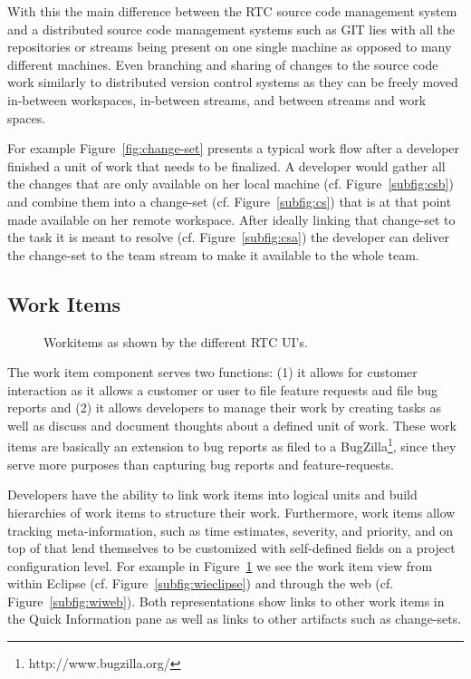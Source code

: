 With this the main difference between the RTC source code management system and a distributed source code management systems such as GIT lies with all the repositories or streams being present on one single machine as opposed to many different machines.
Even branching and sharing of changes to the source code work similarly to distributed version control systems as they can be freely moved in-between workspaces, in-between streams, and between streams and work spaces.

For example Figure~\ref{fig:change-set} presents a typical work flow after a developer finished a unit of work that needs to be finalized.
A developer would gather all the changes that are only available on her local machine (cf. Figure~\ref{subfig:csb}) and combine them into a change-set (cf. Figure~\ref{subfig:cs}) that is at that point made available on her remote workspace.
After ideally linking that change-set to the task it is meant to resolve (cf. Figure~\ref{subfig:csa}) the developer can deliver the change-set to the team stream to make it available to the whole team.

\subsection{Work Items}
\begin{figure}
\centering
{}

\caption{Workitems as shown by the different RTC UI's.}
\label{fig:wi}
\end{figure}
The work item component serves two functions: (1) it allows for customer interaction as it allows a customer or user to file feature requests and file bug reports and (2) it allows developers to manage their work by creating tasks as well as discuss and document thoughts about a defined unit of work.
These work items are basically an extension to bug reports as filed to a BugZilla\footnote{http://www.bugzilla.org/}, since they serve more purposes than capturing bug reports and feature-requests.

Developers have the ability to link work items into logical units and build hierarchies of work items to structure their work.
Furthermore, work items allow tracking meta-information, such as time estimates, severity, and priority, and on top of that lend themselves to be customized with self-defined fields on a project configuration level.
For example in Figure~\ref{fig:wi} we see the work item view from within Eclipse (cf. Figure~\ref{subfig:wieclipse}) and through the web (cf. Figure~\ref{subfig:wiweb}).
Both representations show links to other work items in the Quick Information pane as well as links to other artifacts such as change-sets.

